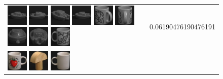 \begin{figure}[tbp]
\begin{center}
\begin{tabular}{m{11cm} | m{3cm} |}
\includegraphics[width=1cm]{coil/beeld-24.eps}
\includegraphics[width=1cm]{coil/beeld-27.eps}
\includegraphics[width=1cm]{coil/beeld-25.eps}
\includegraphics[width=1cm]{coil/beeld-24.eps}
\includegraphics[width=1cm]{coil/beeld-49.eps}
\includegraphics[width=1cm]{coil/beeld-50.eps}
\includegraphics[width=1cm]{coil/beeld-28.eps}
\includegraphics[width=1cm]{coil/beeld-26.eps}
\includegraphics[width=1cm]{coil/beeld-51.eps}
& {\scriptsize 0.06190476190476191}
\\
\includegraphics[width=1cm]{coil/beeld-36.eps}
\includegraphics[width=1cm]{coil/beeld-3.eps}
\includegraphics[width=1cm]{coil/beeld-37.eps}

\end{tabular}
\end{center}
\end{figure}
